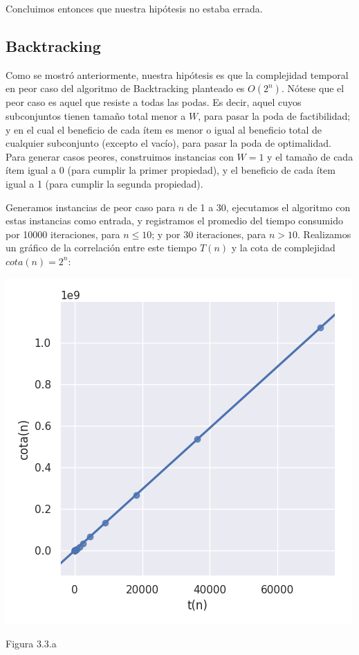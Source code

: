 \documentclass[a4paper]{article}
\begin{document}
Concluimos entonces que nuestra hipótesis no estaba errada.



\subsection{Backtracking}

Como se mostró anteriormente, nuestra hipótesis es que la complejidad temporal en peor caso del algoritmo de Backtracking planteado es $O(2^n)$. Nótese que el peor caso es aquel que resiste a todas las podas. Es decir, aquel cuyos subconjuntos tienen tamaño total menor a $W$, para pasar la poda de factibilidad; y en el cual el beneficio de cada ítem es menor o igual al beneficio total de cualquier subconjunto (excepto el vacío), para pasar la poda de optimalidad. Para generar casos peores, construimos instancias con $W = 1$ y el tamaño de cada ítem igual a 0 (para cumplir la primer propiedad), y el beneficio de cada ítem igual a 1 (para cumplir la segunda propiedad). 

Generamos instancias de peor caso para $n$ de 1 a 30, ejecutamos el algoritmo con estas instancias como entrada, y registramos el promedio del tiempo consumido por 10000 iteraciones, para $n \leq 10$; y por 30 iteraciones, para $n > 10$. Realizamos un gráfico de la correlación entre este tiempo $T(n)$ y la cota de complejidad $cota(n) = 2^n $: 

\begin{center}
    \includegraphics[scale=0.6]{BTcorrelacConCota.png}
    
    
	\caption{Figura 3.3.a  }
  \end{center}
\end{document}
